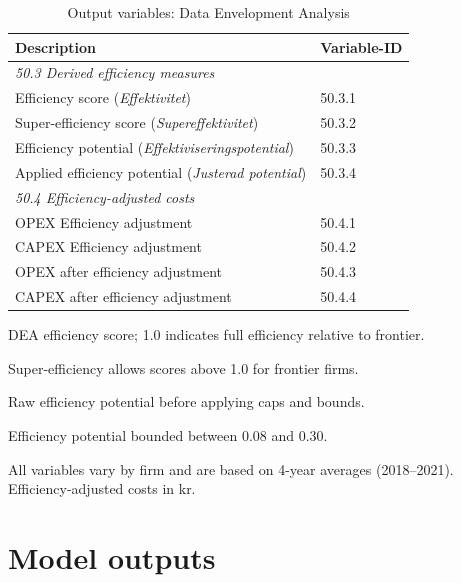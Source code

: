 \begin{table}[H]
\centering
\footnotesize
\begin{threeparttable}
\caption{Output variables: Data Envelopment Analysis}
\label{tab:dea-output-variables}
\begin{tabular}{@{}ll@{}}
\toprule
\textbf{Description} & \textbf{Variable-ID} \\
\midrule
\multicolumn{2}{l}{\textit{50.3 Derived efficiency measures}} \\
Efficiency score (\textit{Effektivitet})\tnote{a} & 50.3.1 \\
Super-efficiency score (\textit{Supereffektivitet})\tnote{b} & 50.3.2 \\
Efficiency potential (\textit{Effektiviseringspotential})\tnote{c} & 50.3.3 \\
Applied efficiency potential (\textit{Justerad potential})\tnote{d} & 50.3.4 \\
\midrule
\multicolumn{2}{l}{\textit{50.4 Efficiency-adjusted costs}} \\
OPEX Efficiency adjustment & 50.4.1 \\
CAPEX Efficiency adjustment & 50.4.2 \\
OPEX after efficiency adjustment & 50.4.3 \\
CAPEX after efficiency adjustment & 50.4.4 \\
\bottomrule
\end{tabular}
\begin{tablenotes}
\item[a] DEA efficiency score; 1.0 indicates full efficiency relative to frontier.
\item[b] Super-efficiency allows scores above 1.0 for frontier firms.
\item[c] Raw efficiency potential before applying caps and bounds.
\item[d] Efficiency potential bounded between 0.08 and 0.30.
\item All variables vary by firm and are based on 4-year averages (2018--2021). Efficiency-adjusted costs in kr.
\end{tablenotes}
\end{threeparttable}
\end{table}


\section{Model outputs}

